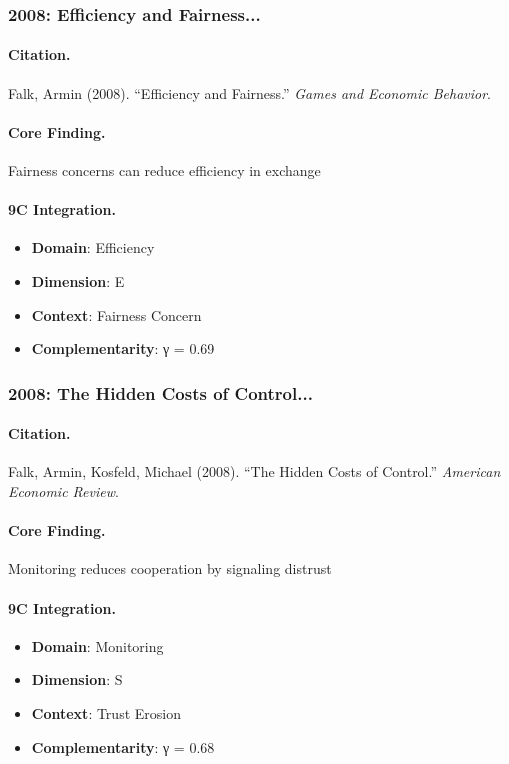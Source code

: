 \subsubsection{2008: Efficiency and Fairness...}

\paragraph{Citation.}
Falk, Armin (2008). ``Efficiency and Fairness.''
\textit{Games and Economic Behavior}.

\paragraph{Core Finding.}
Fairness concerns can reduce efficiency in exchange

\paragraph{9C Integration.}
\begin{itemize}[nosep]
  \item \textbf{Domain}: Efficiency
  \item \textbf{Dimension}: E
  \item \textbf{Context}: Fairness Concern
  \item \textbf{Complementarity}: γ = 0.69
\end{itemize}


\subsubsection{2008: The Hidden Costs of Control...}

\paragraph{Citation.}
Falk, Armin, Kosfeld, Michael (2008). ``The Hidden Costs of Control.''
\textit{American Economic Review}.

\paragraph{Core Finding.}
Monitoring reduces cooperation by signaling distrust

\paragraph{9C Integration.}
\begin{itemize}[nosep]
  \item \textbf{Domain}: Monitoring
  \item \textbf{Dimension}: S
  \item \textbf{Context}: Trust Erosion
  \item \textbf{Complementarity}: γ = 0.68
\end{itemize}


